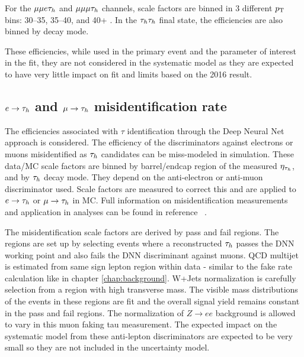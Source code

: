 For the $\mu\mu e \tau_h$ and $\mu\mu\mu\tau_h$ channels, scale factors are binned in 3 different $p_{\mathrm{T}}$ bins: 30--35, 35--40, and 40+ \GeV. In the $\tau_h\tau_h$ final state, the efficiencies are also binned by decay mode. 


These efficiencies, while used in the primary event and the parameter of interest in the fit, they are not considered in the systematic model as they are expected to have very little impact on fit and limits based on the 2016 result. 


\subsection{$e \rightarrow \tau_h$  and $\mu \rightarrow \tau_h$ misidentification rate}
The efficiencies associated with $\tau$ identification through the Deep Neural Net approach is considered. 
The efficiency of the discriminators against electrons or muons misidentified as $\tau_h$ candidates can be miss-modeled in simulation. 
These data/MC scale factors are
binned by barrel/endcap region of the measured $\eta_{\tau_h}$, and by $\tau_h$ decay mode. They depend on the anti-electron or anti-muon discriminator used. 
Scale factors are measured to correct this and are applied to $e \rightarrow \tau_h$ or $\mu \rightarrow \tau_h$ in MC. Full information on misidentification measurements and application in analyses can be found in reference ~\cite{TAUIDTwiki}. 


The misidentification scale factors are derived by pass and fail regions. The regions are set up by selecting events where a reconstructed $\tau_h$ passes the DNN working point and also fails the DNN discriminant against muons. QCD multijet is estimated from same sign lepton region within data - similar to the fake rate calculation like in chapter \ref{chap:background}. W+Jets normalization is carefully selection from a region with high transverse mass. The visible mass distributions of the events in these regions are fit and the overall signal yield remains constant in the pass and fail regions. The normalization of $Z \to e e $ background is allowed to vary in this muon faking tau measurement.   
The expected impact on the systematic model from these anti-lepton discriminators are expected to be very small so they are not included in the uncertainty model.

